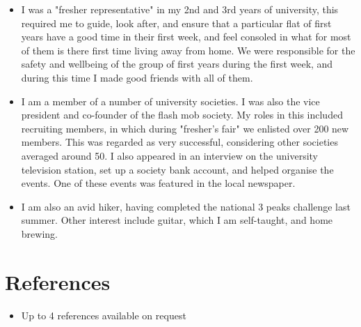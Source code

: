 \documentclass[11pt,a4paper,sans]{moderncv}        %
\begin{document}
\begin{itemize}

\item{I was a "fresher representative" in my 2nd and 3rd years of university, this required me to guide, look after, and ensure that a particular flat of first years have a good time in their first week, and feel consoled in what for most of them is there first time living away from home. We were responsible for the safety and wellbeing of the group of first years during the first week, and during this time I made good friends with all of them.}

\vspace{6pt}

\item{I am a member of a number of university societies. I was also the vice president and co-founder of the flash mob society. My roles in this included recruiting members, in which during "fresher's fair" we enlisted over 200 new members. This was regarded as very successful, considering other societies averaged around 50. I also appeared in an interview on the university television station, set up a society bank account, and helped organise the events. One of these events was featured in the local newspaper.}

\vspace{6pt}

\item{I am also an avid hiker, having completed the national 3 peaks challenge last summer. Other interest include guitar, which I am self-taught, and home brewing.}

\end{itemize}

\section{References}

\vspace{6pt}
 
\begin{itemize}

\item{Up to 4 references available on request}

\end{itemize}

\nocite{*}

\end{document}
